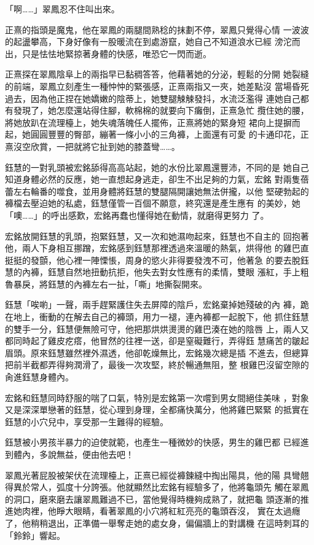 「啊……」翠鳳忍不住叫出來。

正熹的指頭是魔鬼，他在翠鳳的兩腿間熟稔的抹劃不停，翠鳳只覺得心情
一波波的起盪攀高，下身好像有一股暖流在到處游竄，她自己不知道浪水已經
滂沱而出，只是怯怯地緊掠著身體的快感，唯恐它一閃而逝。

正熹探在翠鳳陰阜上的兩指早已黏稠答答，他藉著她的分泌，輕鬆的分開
她裂縫的前端，翠鳳立刻產生一種忡忡的緊張感，正熹兩指又一夾，她差點沒
當場昏死過去，因為他正捏在她嬌嫩的陰蒂上，她雙腿觫觫發抖，水流泛濫得
連她自己都有發現了，她怎麼還站得住腳，軟棉棉的就要向下癱倒，正熹急忙
攬住她的腰，將她放趴在流理檯上，她失魂落魄任人擺佈，正熹將她的緊身短
裙向上提摒而起，她圓圓豐豐的臀部，繃著一條小小的三角褲，上面還有可愛
的卡通印花，正熹沒空欣賞，一把就將它扯到她的膝蓋彎……。

鈺慧的一對乳頭被宏銘舔得高高站起，她的水份比翠鳳還豐沛，不同的是
她自己知道身體必然的反應，她一直想起身逃走，卻生不出足夠的力氣，宏銘
對兩隻蓓蕾左右輪番的噬食，並用身體將鈺慧的雙腿隔開讓她無法併攏，以他
堅硬勃起的褲檔去壓迫她的私處，鈺慧僅管一百個不願意，終究還是產生應有
的美妙，她「噢……」的呼出感歎，宏銘再蠢也懂得她在動情，就磨得更努力
了。

宏銘放開鈺慧的乳頭，抱緊鈺慧，又一次和她濕吻起來，鈺慧也不自主的
回抱著他，兩人下身相互挪蹭，宏銘感到鈺慧那裡透過來溫暖的熱氣，烘得他
的雞巴直挺挺的發顫，他心裡一陣慄悵，周身的慾火非得要發洩不可，他著急
的要去脫鈺慧的內褲，鈺慧自然地扭動抗拒，他失去對女性應有的柔情，雙眼
漲紅，手上粗魯暴戾，將鈺慧的內褲左右一扯，「嘶」地撕裂開來。

鈺慧「唉喲」一聲，兩手趕緊護住失去屏障的陰戶，宏銘棄掉她殘破的內
褲，跪在地上，衝動的在解去自己的褲頭，用力一褪，連內褲都一起脫下，他
抓住鈺慧的雙手一分，鈺慧便無險可守，他把那烘烘燙燙的雞巴湊在她的陰唇
上，兩人又都同時起了雞皮疙瘩，他冒然的往裡一送，卻是窒礙難行，弄得鈺
慧痛苦的皺起眉頭。原來鈺慧雖然裡外濕透，他卻乾燥無比，宏銘幾次總是插
不進去，但總算把前半截都弄得夠潤滑了，最後一次攻堅，終於暢通無阻，整
根雞巴沒留空隙的肏進鈺慧身體內。

宏銘和鈺慧同時舒服的喘了口氣，特別是宏銘第一次嚐到男女間絕佳美味
，對象又是深深單戀著的鈺慧，從心理到身理，全都痛快萬分，他將雞巴緊緊
的抵實在鈺慧的小穴兒中，享受那一生難得的經驗。

鈺慧被小男孩半暴力的迫使就範，也產生一種微妙的快感，男生的雞巴都
已經進到體內，多說無益，便由他去吧！

翠鳳光著屁股被架伏在流理檯上，正熹已經從褲鍊縫中掏出陽具，他的陽
具彎翹得異於常人，弧度十分誇張。他就顯然比宏銘有經驗多了，他將龜頭先
觸在翠鳳的洞口，磨來磨去讓翠鳳難過不已，當他覺得時機夠成熟了，就把龜
頭逐漸的推進她肉裡，他睜大眼睛，看著翠鳳的小穴將紅紅亮亮的龜頭吞沒，
實在太過癮了，他稍稍退出，正準備一舉奪走她的處女身，偏偏牆上的對講機
在這時刺耳的「鈴鈴」響起。

